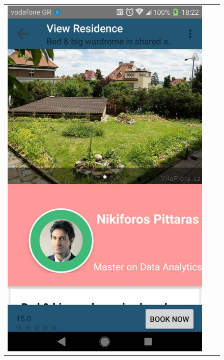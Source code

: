 \documentclass[12pt]{article}
\begin{document}
	\begin{center}
		\begin{figure}
			\begin{tabular}{c c c }
				
				\includegraphics[scale=0.18, keepaspectratio]{slider.jpg}  
				&

\end{tabular}
\end{figure}
\end{center}
\end{document}
